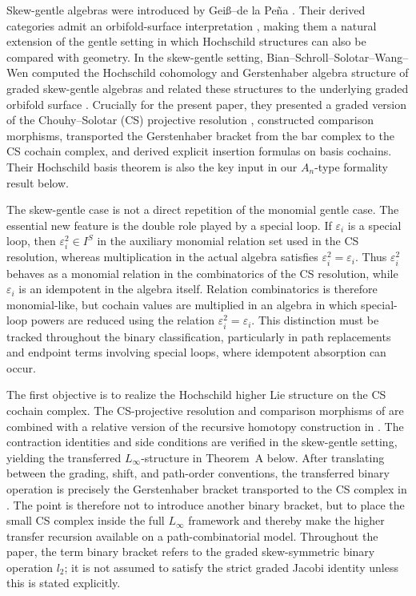 \documentclass[11pt,a4paper,reqno]{amsart}
\newcommand{\ep}{\varepsilon}
\theoremstyle{plain}
\theoremstyle{definition}
\numberwithin{equation}{section}
\begin{document}
	Skew-gentle algebras were introduced by Gei\ss--de la Pe\~na \cite{GP99}.
	Their derived categories admit an orbifold-surface interpretation
	\cite{LFSV22}, making them a natural extension of the gentle setting in which
	Hochschild structures can also be compared with geometry.  In the
	skew-gentle setting, Bian--Schroll--Solotar--Wang--Wen computed the Hochschild
	cohomology and Gerstenhaber algebra structure of graded skew-gentle algebras
	and related these structures to the underlying graded orbifold surface
	\cite{BSSWW26}.  Crucially for the present paper, they presented a graded
	version of the Chouhy--Solotar (CS) projective resolution \cite{CS15},
	constructed comparison morphisms, transported the Gerstenhaber bracket from
	the bar complex to the CS cochain complex, and derived explicit insertion
	formulas on basis cochains.  Their Hochschild basis theorem is also the key
	input in our $A_n$-type formality result below.
	
	The skew-gentle case is not a direct repetition of the monomial gentle case.
	The essential new feature is the double role played by a special loop.  If
	$\ep_i$ is a special loop, then $\ep_i^2\in I^S$ in the auxiliary monomial
	relation set used in the CS resolution, whereas multiplication in the actual
	algebra satisfies $\ep_i^2=\ep_i$.  Thus $\ep_i^2$ behaves as a
	monomial relation in the combinatorics of the CS resolution, while $\ep_i$ is
	an idempotent in the algebra itself.  Relation combinatorics is therefore
	monomial-like, but cochain values are multiplied in an algebra in which
	special-loop powers are reduced using the relation $\ep_i^2=\ep_i$.  This distinction must be
	tracked throughout the binary classification, particularly in path
	replacements and endpoint terms involving special loops, where idempotent
	absorption can occur.
	
	The first objective is to realize the Hochschild higher Lie structure
	on the CS cochain complex. The CS-projective resolution and comparison
	morphisms of \cite{BSSWW26} are combined with a relative version of
	the recursive homotopy construction in \cite{RR22}. The contraction
	identities and side conditions are verified in the skew-gentle
	setting, yielding the transferred $L_\infty$-structure in
	Theorem~A below. After translating between the grading, shift, and path-order conventions, the
	transferred binary operation is precisely the Gerstenhaber bracket transported
	to the CS complex in \cite[Section~3.6]{BSSWW26}.  The point is therefore not
	to introduce another binary bracket, but to place the small CS complex inside
	the full $L_\infty$ framework and thereby make the higher transfer recursion
	available on a path-combinatorial model.  Throughout the paper, the term
	binary bracket refers to the graded skew-symmetric binary operation
	$l_2$; it is not assumed to satisfy the strict graded Jacobi identity unless
	this is stated explicitly.
	
\end{document}
